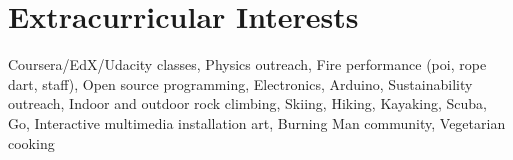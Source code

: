 \documentclass[11pt]{seilercv}
\begin{document}
\section{Extracurricular Interests} {Coursera/EdX/Udacity classes, Physics outreach, Fire performance (poi, rope dart, staff), Open source programming, Electronics, Arduino,
Sustainability outreach, Indoor and outdoor rock climbing, Skiing, Hiking, Kayaking, Scuba, Go, Interactive multimedia installation art, Burning Man community, Vegetarian cooking} 
\pagebreak
\end{document}
